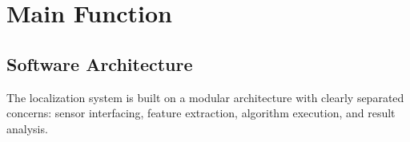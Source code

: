 %
%

\chapter{Main Function}

\section{Software Architecture}
The localization system is built on a modular architecture with clearly separated concerns: sensor interfacing, feature extraction, algorithm execution, and result analysis.

